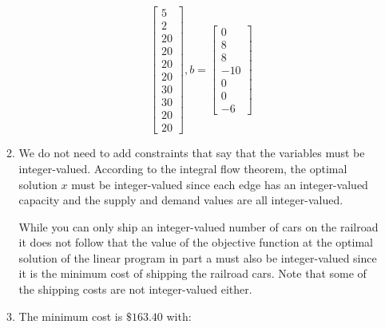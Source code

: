 \documentclass{article}
\begin{document}
\begin{enumerate}
\begin{enumerate}
$$\begin{bmatrix}
5\\
2\\
20\\
20\\
20\\
20\\
30\\
30\\
20\\
20
\end{bmatrix},
b= 
\begin{bmatrix}
0 \\
8 \\
8 \\
-10 \\
0 \\
0 \\
-6
\end{bmatrix}
$$

\item

We do not need to add constraints that say that the variables must be integer-valued. According to the integral flow theorem, the optimal solution $x$ must be integer-valued since each edge has an integer-valued capacity and the supply and demand values are all integer-valued. 

While you can only ship an integer-valued number of cars on the railroad it does not follow that the value of the objective function at the optimal solution of the linear program in part a must also be integer-valued since it is the minimum cost of shipping the railroad cars. Note that some of the shipping costs are not integer-valued either. \\

\item 

The minimum cost is $\$163.40$ with:


\end{enumerate}
\end{enumerate}
\end{document}
